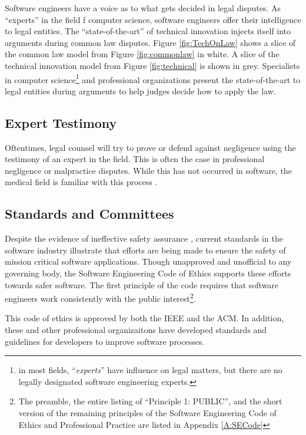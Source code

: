 Software engineers have a voice as to what gets decided in legal disputes. As
``experts'' in the field f computer science, software engineers offer their 
intelligence to legal entities. The ``state-of-the-art'' of technical innovation
injects itself into arguments during common law disputes. Figure
\ref{fig:TechOnLaw} shows a slice of the common law model from Figure
\ref{fig:commonlaw} in white. A slice of the technical innovation model from
Figure \ref{fig:technical} is shown in grey. Specialists in computer
science\footnote{in most fields, ``\textit{experts}'' have influence on legal
matters, but there are no legally designated software engineering experts.} and
professional organizations present the state-of-the-art to legal entities during
arguments to help judges decide how to apply the law.

\subsection{Expert Testimony}

Oftentimes, legal counsel will try to prove or defend against negligence using
the testimony of an expert in the field. This is often the case in professional
negligence or malpractice disputes. While this has not occurred in software, the
medical field is familiar with this process \cite{Deitschel02}.

\subsection{Standards and Committees}
Despite the evidence of ineffective safety assurance \cite{Therac25,Maisel05},
current standards in the software industry illustrate that efforts are being
made to ensure the safety of mission critical software applications. Though
unapproved and unofficial to any governing body, the Software Engineering Code
of Ethics supports these efforts towards safer software. The first principle of
the code requires that software engineers work consistently with the public
interest\footnote{The preamble, the entire listing of ``Principle 1: PUBLIC'',
and the short version of the remaining principles of the Software Engineering
Code of Ethics and Professional Practice are listed in Appendix \ref{A:SECode}}.

This code of ethics is approved by both the IEEE and the ACM. In addition, these
and other professional organizaitons  have developed standards and guidelines
for developers to improve software processes.


